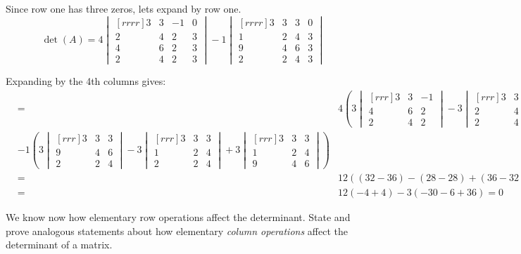 \begin{solution}
Since row one has three zeros, lets expand by row one.\\
$$ \det(A) = 4
\begin{vmatrix}[rrrr]
3&3&-1&0\\
2&4&2&3\\
4&6&2&3\\
2&4&2&3
\end{vmatrix}
-1
\begin{vmatrix}[rrrr]
3&3&3&0\\
1&2&4&3\\
9&4&6&3\\
2&2&4&3
\end{vmatrix}
$$

Expanding by the 4th columns gives:\\
\begin{eqnarray*}
&=& 4\left(3
\begin{vmatrix}[rrr]
3&3&-1\\
4&6&2\\
2&4&2
\end{vmatrix}
-3
\begin{vmatrix}[rrr]
3&3&-1\\
2&4&2\\
2&4&2
\end{vmatrix}
+3
\begin{vmatrix}[rrr]
3&3&-1\\
2&4&2\\
4&6&2
\end{vmatrix}
\right)\\
&-1
\left(3
\begin{vmatrix}[rrr]
3&3&3\\
9&4&6\\
2&2&4
\end{vmatrix}
-3
\begin{vmatrix}[rrr]
3&3&3\\
1&2&4\\
2&2&4
\end{vmatrix}
+3
\begin{vmatrix}[rrr]
3&3&3\\
1&2&4\\
9&4&6
\end{vmatrix}
\right)\\
&=&12((32-36)-(28-28)+(36-32))-3((138-168)-(54-48)+(156-120))\\
&=&12(-4 +4)-3(-30-6+36) = 0 
\end{eqnarray*}
\end{solution}
\ii\label{ex:detcolumnops} We know now how elementary row operations affect the determinant. State and prove analogous statements about how elementary {\em column operations} affect the determinant of a matrix. 
